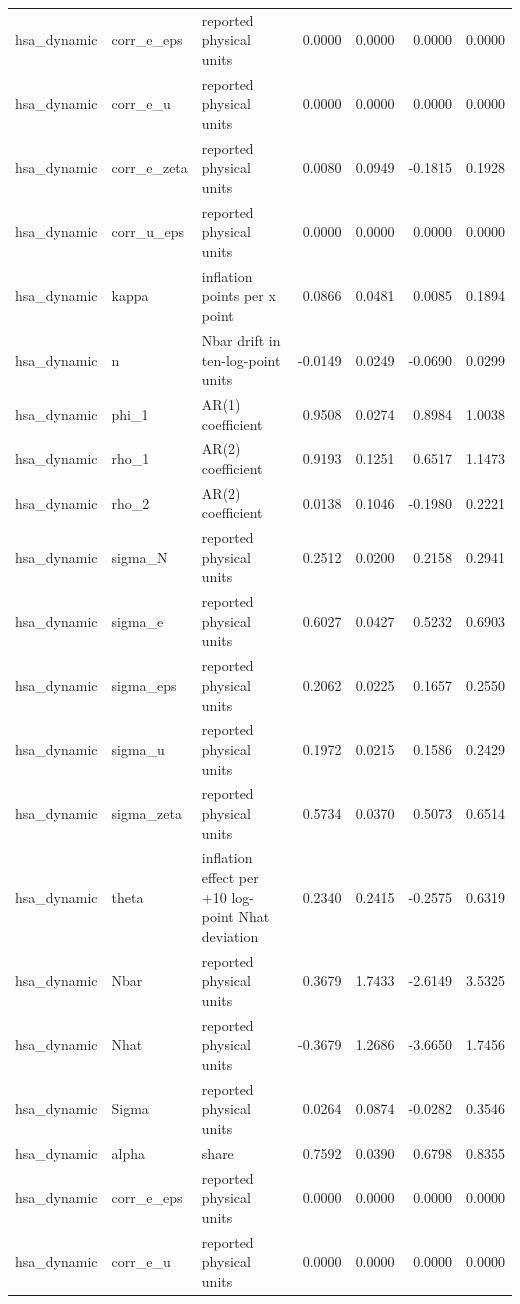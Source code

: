 \begin{tabular}{lllrrrr}
hsa\_dynamic & corr\_e\_eps & reported physical units & 0.0000 & 0.0000 & 0.0000 & 0.0000 \\
hsa\_dynamic & corr\_e\_u & reported physical units & 0.0000 & 0.0000 & 0.0000 & 0.0000 \\
hsa\_dynamic & corr\_e\_zeta & reported physical units & 0.0080 & 0.0949 & -0.1815 & 0.1928 \\
hsa\_dynamic & corr\_u\_eps & reported physical units & 0.0000 & 0.0000 & 0.0000 & 0.0000 \\
hsa\_dynamic & kappa & inflation points per x point & 0.0866 & 0.0481 & 0.0085 & 0.1894 \\
hsa\_dynamic & n & Nbar drift in ten-log-point units & -0.0149 & 0.0249 & -0.0690 & 0.0299 \\
hsa\_dynamic & phi\_1 & AR(1) coefficient & 0.9508 & 0.0274 & 0.8984 & 1.0038 \\
hsa\_dynamic & rho\_1 & AR(2) coefficient & 0.9193 & 0.1251 & 0.6517 & 1.1473 \\
hsa\_dynamic & rho\_2 & AR(2) coefficient & 0.0138 & 0.1046 & -0.1980 & 0.2221 \\
hsa\_dynamic & sigma\_N & reported physical units & 0.2512 & 0.0200 & 0.2158 & 0.2941 \\
hsa\_dynamic & sigma\_e & reported physical units & 0.6027 & 0.0427 & 0.5232 & 0.6903 \\
hsa\_dynamic & sigma\_eps & reported physical units & 0.2062 & 0.0225 & 0.1657 & 0.2550 \\
hsa\_dynamic & sigma\_u & reported physical units & 0.1972 & 0.0215 & 0.1586 & 0.2429 \\
hsa\_dynamic & sigma\_zeta & reported physical units & 0.5734 & 0.0370 & 0.5073 & 0.6514 \\
hsa\_dynamic & theta & inflation effect per +10 log-point Nhat deviation & 0.2340 & 0.2415 & -0.2575 & 0.6319 \\
hsa\_dynamic & Nbar & reported physical units & 0.3679 & 1.7433 & -2.6149 & 3.5325 \\
hsa\_dynamic & Nhat & reported physical units & -0.3679 & 1.2686 & -3.6650 & 1.7456 \\
hsa\_dynamic & Sigma & reported physical units & 0.0264 & 0.0874 & -0.0282 & 0.3546 \\
hsa\_dynamic & alpha & share & 0.7592 & 0.0390 & 0.6798 & 0.8355 \\
hsa\_dynamic & corr\_e\_eps & reported physical units & 0.0000 & 0.0000 & 0.0000 & 0.0000 \\
hsa\_dynamic & corr\_e\_u & reported physical units & 0.0000 & 0.0000 & 0.0000 & 0.0000 \\

\end{tabular}
